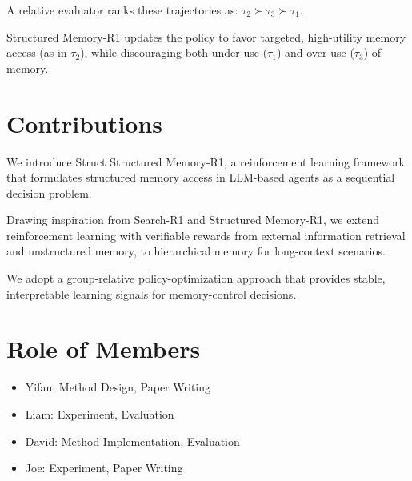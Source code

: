 \documentclass{article}
\begin{document}
A relative evaluator ranks these trajectories as:
$
\tau_2 \succ \tau_3 \succ \tau_1.
$

Structured Memory-R1 updates the policy to favor targeted, high-utility memory access (as in $\tau_2$), while discouraging both under-use ($\tau_1$) and over-use ($\tau_3$) of memory.


\section{Contributions}

We introduce Struct Structured Memory-R1, a reinforcement learning framework that formulates structured memory access in LLM-based agents as a sequential decision problem. 

Drawing inspiration from Search-R1 and Structured Memory-R1, we extend reinforcement learning with verifiable rewards from external information retrieval and unstructured memory, to hierarchical memory for long-context scenarios.

We adopt a group-relative policy-optimization approach that provides stable, interpretable learning signals for memory-control decisions.


\section{Role of Members}

\begin{itemize}
    \item Yifan: Method Design, Paper Writing
    \item Liam: Experiment, Evaluation
    \item David: Method Implementation, Evaluation
    \item Joe: Experiment, Paper Writing
\end{itemize}
\newpage


\end{document}
